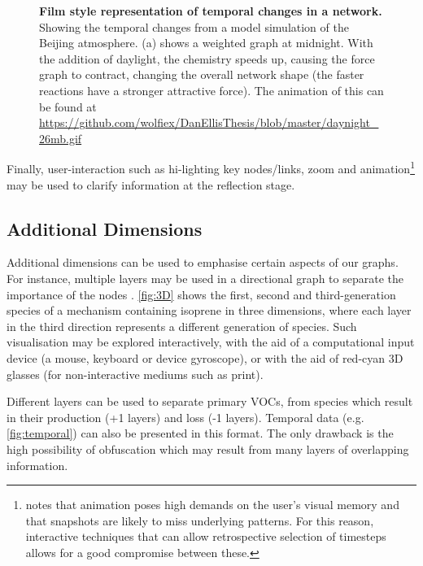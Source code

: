 \begin{figure}[H]
\begin{subfigure}[b]{.49\textwidth}
    \caption{}
    \end{subfigure}
       \caption{\textbf{Film style representation of temporal changes in a network.} Showing the temporal changes from a model simulation of the Beijing atmosphere. (a) shows a weighted graph at midnight. With the addition of daylight, the chemistry speeds up, causing the force graph to contract, changing the overall network shape (the faster reactions have a stronger attractive force). The animation of this can be found at \url{https://github.com/wolfiex/DanEllisThesis/blob/master/daynight_26mb.gif}}
     \label{fig:temporal}
\end{figure}


Finally, user-interaction such as hi-lighting key nodes/links, zoom and animation\footnote{\citep{ch8} notes that animation poses high demands on the user's visual memory and that snapshots are likely to miss underlying patterns.  For this reason, interactive techniques that can allow retrospective selection of timesteps allows for a good compromise between these.} may be used to clarify information at the reflection stage.

\subsection{Additional Dimensions}
Additional dimensions can be used to emphasise certain aspects of our graphs. For instance, multiple layers may be used in a directional graph to separate the importance of the nodes \citep{IPSEPCOLA}. \autoref{fig:3D} shows the first, second and third-generation species of a mechanism containing isoprene in three dimensions, where each layer in the third direction represents a different generation of species. Such visualisation may be explored interactively, with the aid of a computational input device (a mouse, keyboard or device gyroscope), or with the aid of red-cyan 3D glasses (for non-interactive mediums such as print). 

 Different layers can be used to separate primary VOCs, from species which result in their production (+1 layers) and loss (-1 layers).
 Temporal data (e.g. \autoref{fig:temporal}) can also be presented in this format. The only drawback is the high possibility of obfuscation which may result from many layers of overlapping information. 



